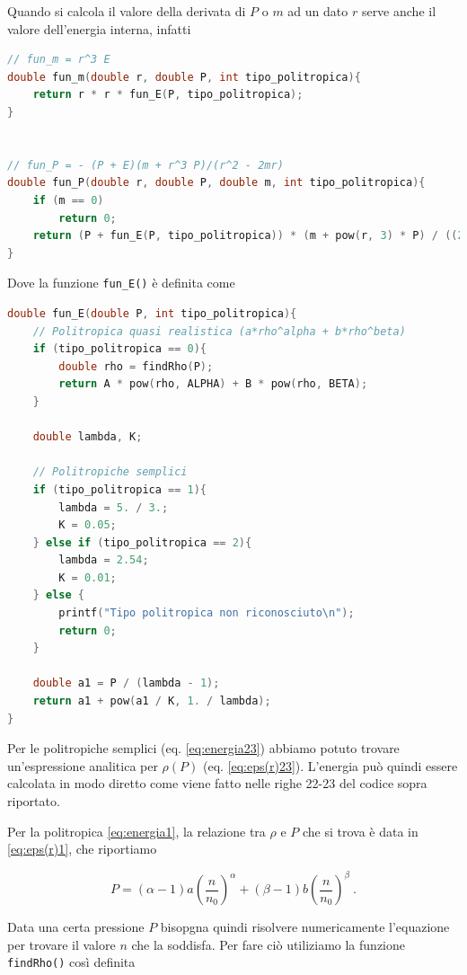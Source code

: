 \documentclass[a4paper, titlepage]{article}
\begin{document}
Quando si calcola il valore della derivata di $P$ o $m$ ad un dato $r$ serve anche il valore dell'energia interna, infatti
\begin{lstlisting}[language=C]
// fun_m = r^3 E
double fun_m(double r, double P, int tipo_politropica){
    return r * r * fun_E(P, tipo_politropica);
}


// fun_P = - (P + E)(m + r^3 P)/(r^2 - 2mr)
double fun_P(double r, double P, double m, int tipo_politropica){
    if (m == 0)
        return 0;
    return (P + fun_E(P, tipo_politropica)) * (m + pow(r, 3) * P) / ((2 * m - r) * r);
}
\end{lstlisting}
Dove la funzione \texttt{fun\_E()} è definita come
\begin{lstlisting}[language=C]
double fun_E(double P, int tipo_politropica){
    // Politropica quasi realistica (a*rho^alpha + b*rho^beta)
    if (tipo_politropica == 0){
        double rho = findRho(P);
        return A * pow(rho, ALPHA) + B * pow(rho, BETA);
    }

    double lambda, K;

    // Politropiche semplici
    if (tipo_politropica == 1){
        lambda = 5. / 3.;
        K = 0.05;
    } else if (tipo_politropica == 2){
        lambda = 2.54;
        K = 0.01;
    } else {
        printf("Tipo politropica non riconosciuto\n");
        return 0;
    }

    double a1 = P / (lambda - 1);
    return a1 + pow(a1 / K, 1. / lambda);
}
\end{lstlisting}

Per le politropiche semplici (eq. \ref{eq:energia23}) abbiamo potuto trovare un'espressione analitica per $\rho (P)$ (eq. \ref{eq:eps(r)23}). L'energia può quindi essere calcolata in modo diretto come viene fatto nelle righe 22-23 del codice sopra riportato.

Per la politropica \ref{eq:energia1}, la relazione tra $\rho$ e $P$ che si trova è data in \ref{eq:eps(r)1}, che riportiamo

\begin{equation}
        P = (\alpha - 1) a \left( \frac{n}{n_0} \right)^{\alpha} + (\beta - 1) b \left( \frac{n}{n_0} \right)^{\beta} \ .
        \label{ap:eq:1}
\end{equation}

Data una certa pressione $P$ bisopgna quindi risolvere numericamente l'equazione per trovare il valore $n$ che la soddisfa. Per fare ciò utiliziamo la funzione \texttt{findRho()} così definita
\end{document}
